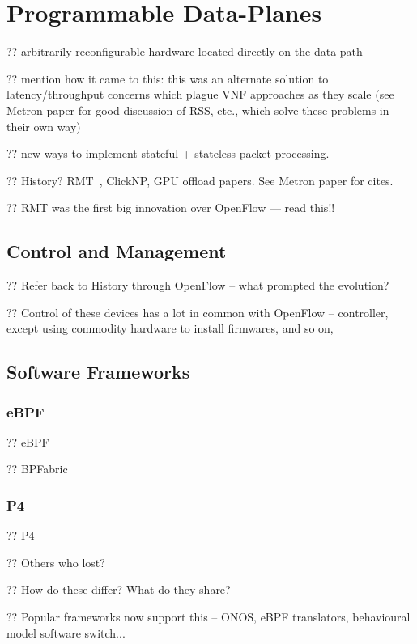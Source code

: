 \chapter{Programmable Data-Planes}

?? arbitrarily reconfigurable hardware located directly on the data path

?? mention how it came to this: this was an alternate solution to latency/throughput concerns which plague VNF approaches as they scale (see Metron paper for good discussion of RSS, etc., which solve these problems in their own way)

?? new ways to implement stateful + stateless packet processing.

?? History? RMT~\parencite{DBLP:conf/sigcomm/BosshartGKVMIMH13}, ClickNP, GPU offload papers. See Metron paper for cites.


?? RMT was the first big innovation over OpenFlow --- read this!!

\section{Control and Management}

?? Refer back to History through OpenFlow -- what prompted the evolution?

?? Control of these devices has a lot in common with OpenFlow -- controller, except using commodity hardware to install firmwares, and so on,

\section{Software Frameworks}

\subsection{eBPF}
?? eBPF

?? BPFabric

\subsection{P4}
?? P4

?? Others who lost?

?? How do these differ? What do they share?

?? Popular frameworks now support this -- ONOS, eBPF translators, behavioural model software switch...

